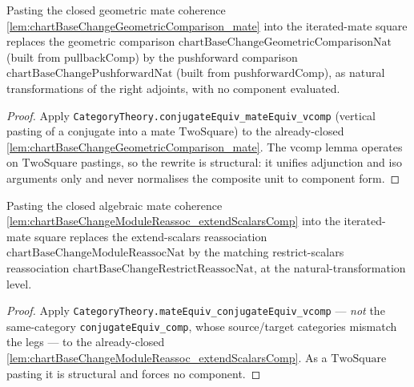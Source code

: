 \begin{lemma}
  \label{lem:ring_square_glue_geom_leg_nat}
  Pasting the closed geometric mate coherence
  \cref{lem:chartBaseChangeGeometricComparison_mate} into the iterated-mate square replaces the
  geometric comparison \(\mathrm{chartBaseChangeGeometricComparisonNat}\) (built from
  \(\mathrm{pullbackComp}\)) by the pushforward comparison
  \(\mathrm{chartBaseChangePushforwardNat}\) (built from \(\mathrm{pushforwardComp}\)), as natural
  transformations of the right adjoints, with no component evaluated.
  \begin{proof}
    Apply \texttt{CategoryTheory.conjugateEquiv\_mateEquiv\_vcomp} (vertical pasting of a conjugate
    into a mate \(\mathrm{TwoSquare}\)) to the already-closed
    \cref{lem:chartBaseChangeGeometricComparison_mate}. The vcomp lemma operates on
    \(\mathrm{TwoSquare}\) pastings, so the rewrite is structural: it unifies adjunction and iso
    arguments only and never normalises the composite unit to component form.
  \end{proof}
\end{lemma}

\begin{lemma}
  \label{lem:ring_square_glue_alg_leg_nat}
  Pasting the closed algebraic mate coherence
  \cref{lem:chartBaseChangeModuleReassoc_extendScalarsComp} into the iterated-mate square replaces the
  extend-scalars reassociation \(\mathrm{chartBaseChangeModuleReassocNat}\) by the matching
  restrict-scalars reassociation \(\mathrm{chartBaseChangeRestrictReassocNat}\), at the
  natural-transformation level.
  \begin{proof}
    Apply \texttt{CategoryTheory.mateEquiv\_conjugateEquiv\_vcomp} --- \emph{not} the same-category
    \texttt{conjugateEquiv\_comp}, whose source/target categories mismatch the legs --- to the
    already-closed \cref{lem:chartBaseChangeModuleReassoc_extendScalarsComp}. As a
    \(\mathrm{TwoSquare}\) pasting it is structural and forces no component.
  \end{proof}
\end{lemma}

